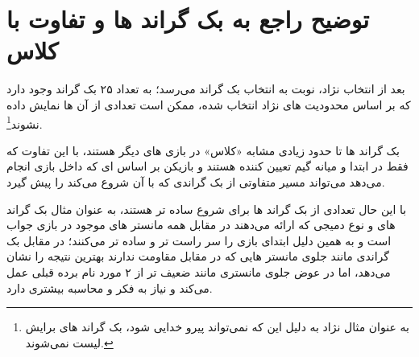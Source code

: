 \chapter{توضیح راجع به بک گراند ها و تفاوت با کلاس}

بعد از انتخاب نژاد، نوبت به انتخاب بک گراند می‌رسد؛
به تعداد ۲۵ بک گراند وجود دارد که بر اساس محدودیت های نژاد انتخاب شده، ممکن است تعدادی از آن ها نمایش داده نشوند\footnote{به عنوان مثال نژاد  به دلیل این که نمی‌تواند پیرو خدایی شود، بک گراند های  برایش لیست نمی‌شوند.}.

بک گراند ها تا حدود زیادی مشابه «کلاس» در بازی های دیگر هستند، با این تفاوت که فقط در ابتدا و میانه گیم تعیین کننده هستند و بازیکن بر اساس  ای که داخل بازی انجام می‌دهد می‌تواند مسیر متفاوتی از بک گراندی که با آن شروع می‌کند را پیش گیرد.

با این حال تعدادی از بک گراند ها برای شروع ساده تر هستند، به عنوان مثال بک گراند های  و  نوع دمیجی که ارائه می‌دهند در مقابل همه مانستر های موجود در بازی جواب است و به همین دلیل ابتدای بازی را سر راست تر و ساده تر می‌کنند؛
در مقابل بک گراندی مانند  جلوی مانستر هایی که در مقابل  مقاومت ندارند بهترین نتیجه را نشان می‌دهد، اما در عوض جلوی مانستری مانند  ضعیف تر از ۲ مورد نام برده قبلی عمل می‌کند و نیاز به فکر و محاسبه بیشتری دارد.
